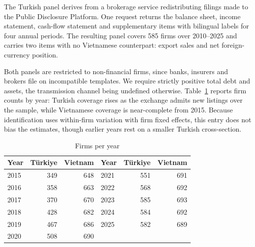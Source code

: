 \documentclass[review,12pt,authoryear]{elsarticle}
\theoremstyle{plain}
\theoremstyle{definition}
\begin{document}
The Turkish panel derives from a brokerage service redistributing filings made
to the Public Disclosure Platform. One request returns the balance sheet, income
statement, cash-flow statement and supplementary items with bilingual labels for
four annual periods. The resulting panel covers 585 firms over 2010--2025 and
carries two items with no Vietnamese counterpart: export sales and net
foreign-currency position.

Both panels are restricted to non-financial firms, since banks, insurers and
brokers file on incompatible templates. We require strictly positive total debt
and assets, the transmission channel being undefined otherwise.
Table~\ref{tab:coverage} reports firm counts by year: Turkish coverage rises
as the exchange admits new listings over the sample, while Vietnamese coverage
is near-complete from 2015. Because identification uses within-firm variation
with firm fixed effects, this entry does not bias the estimates, though earlier
years rest on a smaller Turkish cross-section.

\begin{table}[htbp]
\centering
\caption{Firms per year}
\label{tab:coverage}
\begin{tabular}{lrr@{\hskip 2em}lrr}
\toprule
Year & T\"{u}rkiye & Vietnam & Year & T\"{u}rkiye & Vietnam \\
\midrule
2015 & 349 & 648 & 2021 & 551 & 691 \\
2016 & 358 & 663 & 2022 & 568 & 692 \\
2017 & 370 & 670 & 2023 & 585 & 693 \\
2018 & 428 & 682 & 2024 & 584 & 692 \\
2019 & 467 & 686 & 2025 & 582 & 689 \\
2020 & 508 & 690 &      &     &     \\
\bottomrule
\end{tabular}
\end{table}
\end{document}
